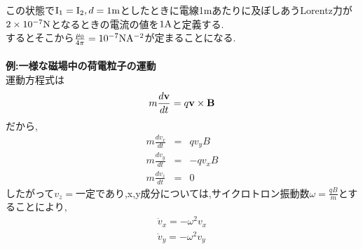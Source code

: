 \documentclass{jsarticle}
\begin{document}
この状態で${\rm I_1}={\rm I_2},d=1{\rm m}$としたときに電線1mあたりに及ぼしあうLorentz力が$2 \times 10^{-7} {\rm N}$となるときの電流の値を$1{\rm A}$と定義する. \\
するとそこから$\frac{\mu_0}{4 \pi}=10^{-7} {\rm NA^{-2}}$が定まることになる. \\
\\
{\bf 例:一様な磁場中の荷電粒子の運動} \\
運動方程式は
\begin{eqnarray*}
m\frac{d{\bf v}}{dt}=q{\bf v} \times {\bf B}
\end{eqnarray*}
だから,
\begin{eqnarray*}
m\frac{dv_x}{dt}&=&qv_yB \\
m\frac{dv_y}{dt}&=&-qv_xB \\
m\frac{dv_z}{dt}&=&0
\end{eqnarray*}
したがって$v_z=\mbox{一定}$であり,x,y成分については,サイクロトロン振動数$\omega=\frac{qB}{m}$とすることにより,
\begin{eqnarray*}
\ddot{v}_x=-\omega^2v_x \\
\ddot{v}_y=-\omega^2v_y
\end{eqnarray*}
\end{document}
